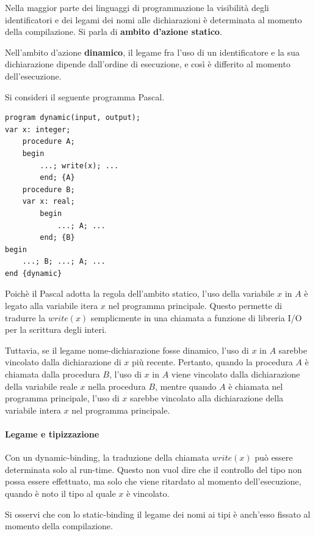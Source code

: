 \documentclass[12pt]{report}
\begin{document}
Nella maggior parte dei linguaggi di programmazione la visibilità degli identificatori e dei legami dei nomi alle dichiarazioni è determinata al momento della compilazione. Si parla di \textbf{ambito d'azione statico}.

Nell'ambito d'azione \textbf{dinamico}, il legame fra l'uso di un identificatore e la sua dichiarazione dipende dall'ordine di esecuzione, e così è differito al momento dell'esecuzione.

Si consideri il seguente programma Pascal.
\begin{lstlisting}[style=pascalstyle]
program dynamic(input, output);
var x: integer;
	procedure A;
	begin
		...; write(x); ...
		end; {A}
	procedure B;
	var x: real;
		begin
			...; A; ...
		end; {B}
begin
	...; B; ...; A; ...
end {dynamic}
\end{lstlisting}
Poichè il Pascal adotta la regola dell'ambito statico, l'uso della variabile $x$ in $A$ è legato alla variabile itera $x$ nel programma principale. Questo permette di tradurre la $write(x)$ semplicmente in una chiamata a funzione di libreria I/O per la scrittura degli interi.

Tuttavia, se il legame nome-dichiarazione fosse dinamico, l'uso di $x$ in $A$ sarebbe vincolato dalla dichiarazione di $x$ più recente. Pertanto, quando la procedura $A $ è chiamata dalla procedura $B$, l'uso di $x$ in $A$ viene vincolato dalla dichiarazione della variabile reale $x$ nella procedura $B$, mentre quando $A$ è chiamata nel programma principale, l'uso di $x$ sarebbe vincolato alla dichiarazione della variabile intera $x$ nel programma principale.
\paragraph{Legame e tipizzazione}
Con un dynamic-binding, la traduzione della chiamata $write(x)$ può essere determinata solo al run-time. Questo non vuol dire che il controllo del tipo non possa essere effettuato, ma solo che viene ritardato al  momento dell'esecuzione, quando è noto il tipo al quale $x$ è vincolato.

Si osservi che con lo static-binding il legame dei nomi ai tipi è anch'esso fissato al momento della compilazione.
\end{document}
